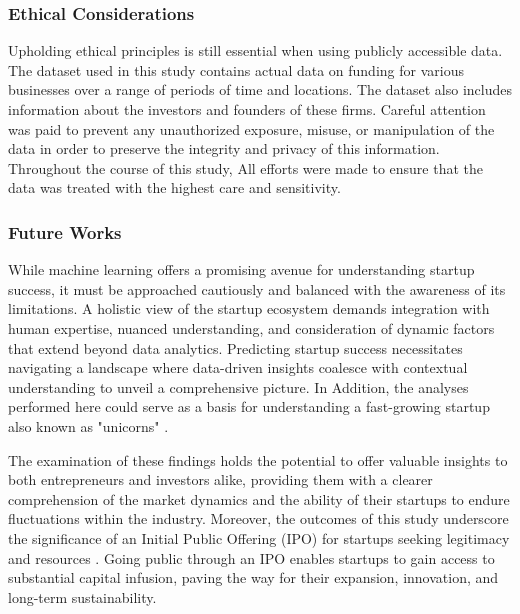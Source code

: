 \documentclass[12pt]{article}
\begin{document}
\subsubsection{Ethical Considerations}

Upholding ethical principles is still essential when using publicly accessible data. The dataset used in this study contains actual data on funding for various businesses over a range of periods of time and locations. The dataset also includes information about the investors and founders of these firms. Careful attention was paid to prevent any unauthorized exposure, misuse, or manipulation of the data in order to preserve the integrity and privacy of this information. Throughout the course of this study, All efforts were made to ensure that the data was treated with the highest care and sensitivity.

\subsubsection{Future Works}

While machine learning offers a promising avenue for understanding startup success, it must be approached cautiously and balanced with the awareness of its limitations. A holistic view of the startup ecosystem demands integration with human expertise, nuanced understanding, and consideration of dynamic factors that extend beyond data analytics. Predicting startup success necessitates navigating a landscape where data-driven insights coalesce with contextual understanding to unveil a comprehensive picture.
In Addition, the analyses performed here could serve as a basis for understanding a fast-growing startup also known as "unicorns" \citep{rodrigues2021companies}.

The examination of these findings holds the potential to offer valuable insights to both entrepreneurs and investors alike, providing them with a clearer comprehension of the market dynamics and the ability of their startups to endure fluctuations within the industry. Moreover, the outcomes of this study underscore the significance of an Initial Public Offering (IPO) for startups seeking legitimacy and resources \citep{lee2008strategy}. Going public through an IPO enables startups to gain access to substantial capital infusion, paving the way for their expansion, innovation, and long-term sustainability. 


\pagebreak

\end{document}
